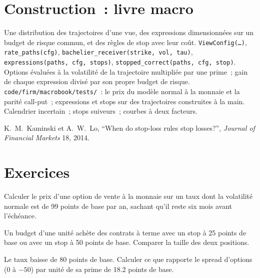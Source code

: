 \section{Construction~: livre macro}\label{bld:s2:discretionary-macro:macrobook}

\begin{build}
 Une distribution des trajectoires d'une vue, des expressions dimensionnées sur un budget de risque commun, et des règles de stop avec leur coût.
 \texttt{ViewConfig(\dots)}, \texttt{rate\_paths(cfg)}, \texttt{bachelier\_receiver(strike, vol, tau)},
\texttt{expressions(paths, cfg, stops)}, \texttt{stopped\_correct(paths, cfg, stop)}.
 Options évaluées à la volatilité de la trajectoire multipliée par une prime~; gain de chaque expression divisé par son propre budget de risque.
 \texttt{code/firm/macrobook/tests/}~: le prix du modèle normal à la monnaie et la parité call-put~; expressions et stops sur
des trajectoires construites à la main.
 Calendrier incertain~; stops suiveurs~; courbes à deux facteurs.
\end{build}

\begin{omsources}
\item K.~M.~Kaminski et A.~W.~Lo, ``When do stop-loss rules stop losses?'', \emph{Journal of Financial Markets} 18, 2014.
\end{omsources}

\section{Exercices}

\begin{exercise}[$\star$]\label{exo:s2:discretionary-macro:1}
Calculer le prix d'une option de vente à la monnaie sur un taux dont la volatilité normale est de 99 points de base par an, sachant qu'il reste six mois avant l'échéance.
\end{exercise}

\begin{exercise}[$\star$]\label{exo:s2:discretionary-macro:2}
Un budget d'une unité achète des contrats à terme avec un stop à 25 points de base ou avec un stop à 50 points de base. Comparer la taille des deux positions.
\end{exercise}

\begin{exercise}[$\star$]\label{exo:s2:discretionary-macro:3}
Le taux baisse de 80 points de base. Calculer ce que rapporte le spread d'options (0 à $-50$) par unité de sa prime de 18.2 points de base.
\end{exercise}

